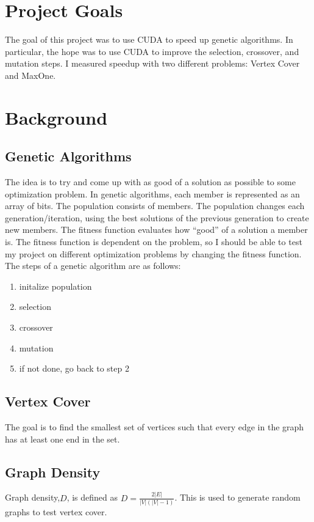 \documentclass[9pt]{article}
\begin{document}
\maketitle

\section{Project Goals}
The goal of this project was to use CUDA to speed up genetic algorithms. In particular, the hope was to use CUDA to improve the selection, crossover, and mutation steps. I measured speedup with two different problems: Vertex Cover and MaxOne.

\section{Background}
	\subsection{Genetic Algorithms}
		The idea is to try and come up with as good of a solution as
possible to some optimization problem. In genetic algorithms, each member is represented as an array
of bits. The population consists of members. The population changes each generation/iteration, using
the best solutions of the previous generation to create new members. The fitness function evaluates
how “good” of a solution a member is. The fitness function is dependent on the problem, so I should be
able to test my project on different optimization problems by changing the fitness function. The steps of
a genetic algorithm are as follows:
		\begin{enumerate}
			\item initalize population
			\item selection
			\item crossover
			\item mutation
			\item if not done, go back to step 2
		\end{enumerate}
	\subsection{Vertex Cover} The goal is to find the smallest set of vertices such that every edge in the graph has at least one end in the set.
	\subsection{Graph Density} Graph density,$D$, is defined as $D=\frac{2|E|}{|V|(|V|-1)}$. This is used to generate random graphs to test vertex cover.
\end{document}
